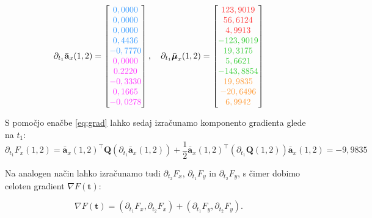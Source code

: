 \documentclass[isrm2, tisk]{fmfdelo}
\newcommand{\aimplicit}{\bar{\mathbf{a}}}
\newcommand{\muimplicit}{\bar{\boldsymbol{\mu}}}
\newcommand{\qmat}{\mathbf{Q}}
\newcommand{\tvec}{\mathbf{t}}
\begin{document}
\begin{equation}
\partial_{t_1} \aimplicit_x(1, 2) = 
\begin{bmatrix}
\textcolor{block1color}{0,0000} \\
\textcolor{block1color}{0,0000} \\
\textcolor{block1color}{0,0000} \\
\textcolor{block1color}{0,4436} \\
\textcolor{block1color}{-0,7770} \\
\textcolor{block2color}{0,0000} \\
\textcolor{block2color}{0.2220} \\
\textcolor{block2color}{-0,3330} \\
\textcolor{block2color}{0,1665} \\
\textcolor{block2color}{-0,0278}
\end{bmatrix}, \quad
\partial_{t_1} \muimplicit_x(1, 2) = 
\begin{bmatrix}
\textcolor{block3color}{123,9019} \\
\textcolor{block3color}{56,6124} \\
\textcolor{block3color}{4,9913} \\
\textcolor{block4color}{-123,9019} \\
\textcolor{block4color}{19,3175} \\
\textcolor{block4color}{5,6621} \\
\textcolor{block4color}{-143,8854} \\
\textcolor{block6color}{19,9835} \\
\textcolor{block6color}{-20,6496} \\
\textcolor{block6color}{6,9942}
\end{bmatrix}
\end{equation}

S pomočjo enačbe \eqref{eq:grad} lahko sedaj izračunamo komponento gradienta glede na $t_1$:
\begin{equation}
    \label{eq:grad_t1}
    \partial_{t_1} F_x(1, 2) = \aimplicit_x(1, 2)^\top \qmat (\partial_{t_1} \aimplicit_x(1, 2)) + \frac{1}{2} \aimplicit_x(1, 2)^\top (\partial_{t_1} \qmat(1, 2)) \aimplicit_x(1, 2) = -9,9835
\end{equation}

Na analogen način lahko izračunamo tudi $\partial_{t_2} F_x$, $\partial_{t_1} F_y$ in $\partial_{t_2} F_y$, s čimer dobimo celoten gradient $\nabla F(\tvec)$:

\begin{equation}
\nabla F(\tvec) = (\partial_{t_1} F_x, \partial_{t_2} F_x) + (\partial_{t_1} F_y, \partial_{t_2} F_y).
\end{equation}
\end{document}
